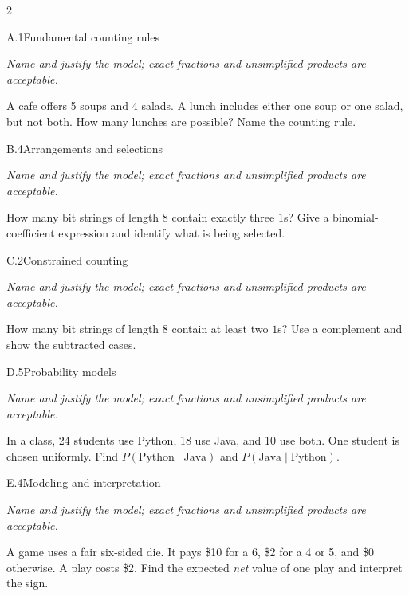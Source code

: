 \documentclass[9pt]{extarticle}
\begin{document}
\FormBreak
{}
\begin{multicols}{2}
\begin{CoreProblem}{A.1}{Fundamental counting rules}
{\scriptsize\textit{Name and justify the model; exact fractions and unsimplified products are acceptable.}\par}
A cafe offers 5 soups and 4 salads. A lunch includes either one soup
    or one salad, but not both. How many lunches are possible? Name the counting
    rule.
\end{CoreProblem}
\begin{CoreProblem}{B.4}{Arrangements and selections}
{\scriptsize\textit{Name and justify the model; exact fractions and unsimplified products are acceptable.}\par}
How many bit strings of length 8 contain exactly three $1$s? Give a
    binomial-coefficient expression and identify what is being selected.
\end{CoreProblem}
\begin{CoreProblem}{C.2}{Constrained counting}
{\scriptsize\textit{Name and justify the model; exact fractions and unsimplified products are acceptable.}\par}
How many bit strings of length 8 contain at least two $1$s? Use a
    complement and show the subtracted cases.
\end{CoreProblem}
\columnbreak
\begin{CoreProblem}{D.5}{Probability models}
{\scriptsize\textit{Name and justify the model; exact fractions and unsimplified products are acceptable.}\par}
In a class, 24 students use Python, 18 use Java, and 10 use both.
    One student is chosen uniformly. Find
    $P(\text{Python}\mid\text{Java})$ and
    $P(\text{Java}\mid\text{Python})$.
\end{CoreProblem}
\begin{CoreProblem}{E.4}{Modeling and interpretation}
{\scriptsize\textit{Name and justify the model; exact fractions and unsimplified products are acceptable.}\par}
A game uses a fair six-sided die. It pays \$10 for a 6, \$2 for a 4
    or 5, and \$0 otherwise. A play costs \$2. Find the expected \emph{net}
    value of one play and interpret the sign.
\end{CoreProblem}
\end{multicols}
\CoreWorkArea
\FormBreak
{}
\end{document}
